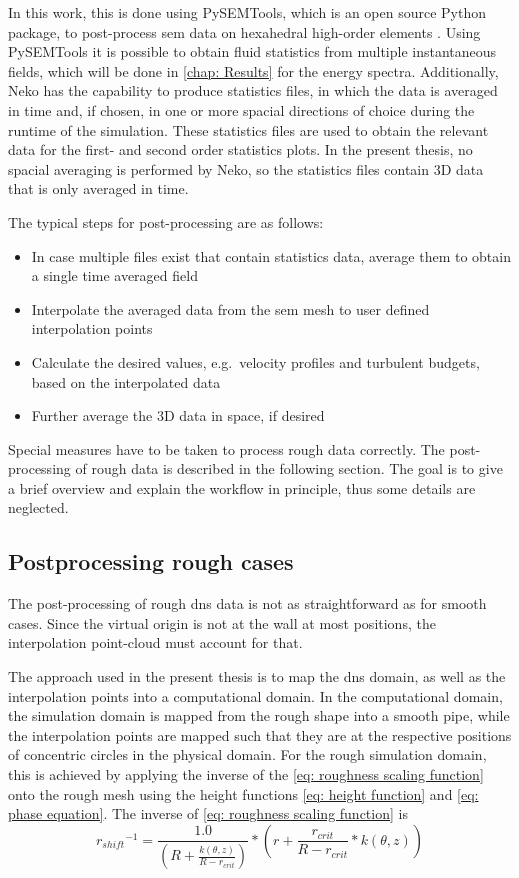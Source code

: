 In this work, this is done using PySEMTools, which is an open source Python package, to post-process \acrshort{sem} data on hexahedral high-order elements \citep{perezPySEMToolsLibraryPostprocessing2026}.
Using PySEMTools it is possible to obtain fluid statistics from multiple instantaneous fields, which will be done in \autoref{chap: Results} for the energy spectra.
Additionally, Neko has the capability to produce statistics files, in which the data is averaged in time and, if chosen, in one or more spacial directions of choice during the runtime of the simulation.
These statistics files are used to obtain the relevant data for the first- and second order statistics plots.
In the present thesis, no spacial averaging is performed by Neko, so the statistics files contain 3D data that is only averaged in time.

The typical steps for post-processing are as follows:
\begin{itemize}
    \item In case multiple files exist that contain statistics data, average them to obtain a single time averaged field
    \item Interpolate the averaged data from the \acrshort{sem} mesh to user defined interpolation points
    \item Calculate the desired values, e.g.\ velocity profiles and turbulent budgets, based on the interpolated data
    \item Further average the 3D data in space, if desired
\end{itemize}
Special measures have to be taken to process rough data correctly.
The post-processing of rough data is described in the following section. 
The goal is to give a brief overview and explain the workflow in principle, thus some details are neglected.
\subsection{Postprocessing rough cases}\label{subsec: Postprocessing rough cases}
The post-processing of rough \acrshort{dns} data is not as straightforward as for smooth cases.
Since the virtual origin is not at the wall at most positions, the interpolation point-cloud  must account for that.


The approach used in the present thesis is to map the \acrshort{dns} domain, as well as the interpolation points into a computational domain.
In the computational domain, the simulation domain is mapped from the rough shape into a smooth pipe, while the interpolation points are mapped such that they are at the respective positions of concentric circles in the physical domain.
For the rough simulation domain, this is achieved by applying the inverse of the \autoref{eq: roughness scaling function} onto the rough mesh using the height functions \autoref{eq: height function} and \autoref{eq: phase equation}.
The inverse of \autoref{eq: roughness scaling function} is
\begin{equation}\label{eq: inverse height function}
     {r_{shift}}^{-1} = \frac{1.0}{\left(R + \frac{k(\theta, z)}{R - r_{crit}}\right)} * \left(r + \frac{r_{crit}}{R - r_{crit}} * k(\theta, z)\right)
\end{equation}

